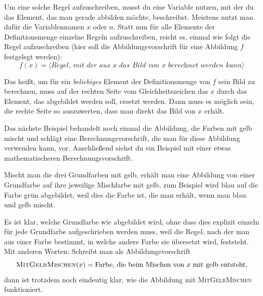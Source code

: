 \documentclass[../../main.tex]{subfiles}
\begin{document}
Um eine solche Regel aufzuschreiben, musst du eine Variable nutzen, mit der du das Element, das man gerade abbilden möchte, beschreibst. Meistens nutzt man dafür die Variablennamen $x$ oder $n$. Statt nun für alle Elemente der Definitionsmenge einzelne Regeln aufzuschreiben, reicht es, einmal wie folgt die Regel aufzuschreiben (hier soll die Abbildungsvorschrift für eine Abbildung $f$ festgelegt werden): 
\[f(x)=\langle\textit{Regel, mit der aus $x$ das Bild von $x$ berechnet werden kann}\rangle\]

Das heißt, um für ein \emph{beliebiges} Element der Definitionsmenge von $f$ sein Bild zu berechnen, muss auf der rechten Seite vom Gleichheitszeichen das $x$ durch das Element, das abgebildet werden soll, ersetzt werden. Dann muss es möglich sein, die rechte Seite so auszuwerten, dass man direkt das Bild von $x$ erhält.

Das nächste Beispiel behandelt noch einmal die Abbildung, die Farben mit gelb mischt und schlägt eine Berechnungsvorschrift, die man für diese Abbildung verwenden kann, vor. Anschließend siehst du ein Beispiel mit einer etwas mathematischeren Berechnungsvorschrift.

\begin{example}
    \parpic[r]{
    }
    
    Mischt man die drei Grundfarben mit gelb, erhält man eine Abbildung von einer Grundfarbe auf ihre jeweilige Mischfarbe mit gelb, zum Beispiel wird blau auf die Farbe grün abgebildet, weil dies die Farbe ist, die man erhält, wenn man blau und gelb mischt.
    
    Es ist klar, welche Grundfarbe wie abgebildet wird, ohne dass dies explizit einzeln für jede Grundfarbe aufgeschrieben werden muss, weil die Regel, nach der man aus einer Farbe bestimmt, in welche andere Farbe sie übersetzt wird, feststeht. Mit anderen Worten: Schreibt man als Abbildungsvorschrift
    \[\textsc{MitGelbMischen}(x)=\text{Farbe, die beim Mischen von } x \text{ mit gelb entsteht},\]
    dann ist trotzdem noch eindeutig klar, wie die Abbildung mit \textsc{MitGelbMischen} funktioniert.
\end{example}
\end{document}
